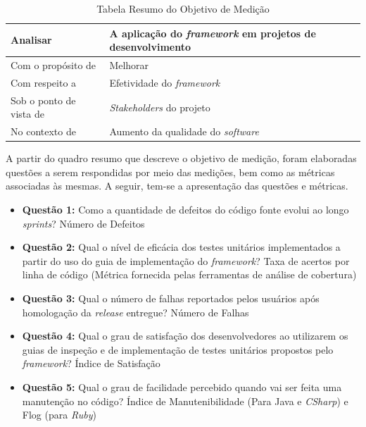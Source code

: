 \begin{table}[h]
\caption{Tabela Resumo do Objetivo de Medição}
\centering
\begin{tabular}{ | m{8cm} | m{8cm} | } 
\hline
Analisar & A aplicação do \textit{framework} em projetos de desenvolvimento \\ 
\hline
Com o propósito de & Melhorar \\ 
\hline
Com respeito a & Efetividade do \textit{framework} \\ 
\hline
Sob o ponto de vista de & \textit{Stakeholders} do projeto \\ 
\hline
No contexto de & Aumento da qualidade do \textit{software} \\ 
\hline
\end{tabular}
\label{table:tabela1}
\end{table}

A partir do quadro resumo que descreve o objetivo de medição, foram elaboradas questões a serem respondidas por meio das medições, bem como as métricas associadas às mesmas. A seguir, tem-se a apresentação das questões e métricas.

\begin{itemize}
	\item \textbf{Questão 1:} Como a quantidade de defeitos do código fonte evolui ao longo \textit{sprints}?
	\subitem Número de Defeitos

	\item \textbf{Questão 2:} Qual o nível de eficácia dos testes unitários implementados a partir do uso do guia de implementação do \textit{framework}?
	\subitem Taxa de acertos por linha de código (Métrica fornecida pelas ferramentas de análise de cobertura)

	\item \textbf{Questão 3:} Qual o número de falhas reportados pelos usuários após homologação da \textit{release} entregue?
	\subitem Número de Falhas

	\item \textbf{Questão 4:} Qual o grau de satisfação dos desenvolvedores ao utilizarem os guias de inspeção e de implementação de testes unitários propostos pelo \textit{framework}?
	\subitem Índice de Satisfação

	\item \textbf{Questão 5:} Qual o grau de facilidade percebido quando vai ser feita uma manutenção no código?
	\subitem Índice de Manutenibilidade (Para Java e \textit{CSharp}) e Flog (para \textit{Ruby})
\end{itemize}


